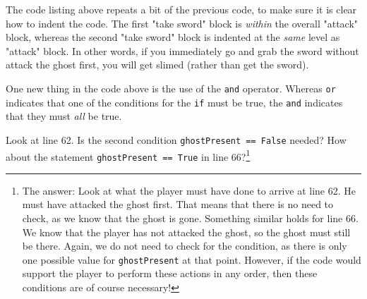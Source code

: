 The code listing above repeats a bit of the previous code, to make sure it is clear how to indent the code. The first "take sword" block is \emph{within} the overall "attack" block, whereas the second "take sword" block is indented at the \emph{same} level as "attack" block. In other words, if you immediately go and grab the sword without attack the ghost first, you will get slimed (rather than get the sword). 

One new thing in the code above is the use of the \texttt{and} operator. Whereas \texttt{or} indicates that one of the conditions for the \texttt{if} must be true, the \texttt{and} indicates that they must \emph{all} be true. 

\begin{Exe} 
Look at line 62. Is the second condition \texttt{ghostPresent == False} needed? How about the statement \texttt{ghostPresent == True} in line 66?\footnote{The answer: Look at what the player must have done to arrive at line 62. He must have attacked the ghost first. That means that there is no need to check, as we know that the ghost is gone. Something similar holds for line 66. We know that the player has not attacked the ghost, so the ghost must still be there. Again, we do not need to check for the condition, as there is only one possible value for \texttt{ghostPresent} at that point. However, if the code would support the player to perform these actions in any order, then these conditions are of course necessary!}   
\end{Exe}  








  